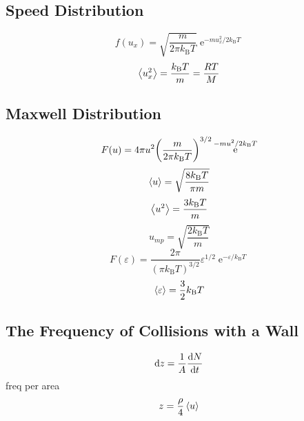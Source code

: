 \documentclass[a4paper]{article}
\DeclareMathOperator{\e}{\mathrm{e}}
\newcommand{\kB}{k_\mathrm{B}}
\numberwithin{equation}{section}
\begin{document}
\subsection{}
\subsection{Speed Distribution}
\begin{equation}\label{key}
f(u_x) = \sqrt{\dfrac{m}{2\pi\kB T}}\e^{-m u_x^2/2\kB T}
\end{equation}
\begin{equation}\label{key}
\ev{u_x^2} = \dfrac{\kB T}{m} = \dfrac{R T}{M}
\end{equation}

\subsection{Maxwell Distribution}
\begin{equation}\label{key}
F(u) = 4\pi u^2 \qty(\dfrac{m}{2\pi\kB T})^{3/2}\e^{-m u^2/2\kB T}
\end{equation}
\begin{equation}\label{key}
\ev{u} = \sqrt{\dfrac{8\kB T}{\pi m}}
\end{equation}
\begin{equation}\label{key}
\ev{u^2} = \dfrac{3\kB T}{m}
\end{equation}
\begin{equation}\label{key}
u_{mp} = \sqrt{\dfrac{2\kB T}{m}}
\end{equation}
\begin{equation}\label{key}
F(\varepsilon) = \dfrac{2\pi}{(\pi \kB T)^{3/2}}\varepsilon^{1/2}\e^{-\varepsilon/\kB T}
\end{equation}
\begin{equation}\label{key}
\ev{\varepsilon} = \dfrac{3}{2}\kB T
\end{equation}

\subsection{The Frequency of Collisions with a Wall}
\begin{equation}\label{key}
\dd z = \dfrac{1}{A}\dv{N}{t}
\end{equation}
freq per area
\begin{equation}\label{key}
z = \dfrac{\rho}{4}\ev{u}
\end{equation}

\subsection{}
\end{document}
